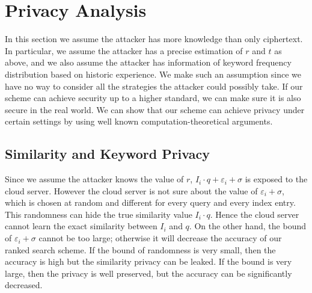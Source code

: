 \documentclass{IEEEtran}
\begin{document}
\section{Privacy Analysis}
In this section we assume the attacker has more knowledge than only ciphertext. In particular, we assume the attacker has a precise estimation of $r$ and $t$ as above, and we also assume the attacker has information of keyword frequency distribution based on historic experience. We make such an assumption since we have no way to consider all the strategies the attacker could possibly take. If our scheme can achieve security up to a higher standard, we can make sure it is also secure in the real world. We can show that our scheme can achieve privacy under certain settings by using well known computation-theoretical arguments.

\subsection{Similarity and Keyword Privacy}
Since we assume the attacker knows the value of $r$, $I_i\cdot q+\varepsilon_i+\sigma$ is exposed to the cloud server. However the cloud server is not sure about the value of $\varepsilon_i+\sigma$, which is chosen at random and different for every query and every index entry. This randomness can hide the true similarity value $I_i\cdot q$. Hence the cloud server cannot learn the exact similarity between $I_i$ and $q$. On the other hand, the bound of $\varepsilon_i+\sigma$ cannot be too large; otherwise it will decrease the accuracy of our ranked search scheme. If the bound of randomness is very small, then the accuracy is high but the similarity privacy can be leaked. If the bound is very large, then the privacy is well preserved, but the accuracy can be significantly decreased.
\end{document}
